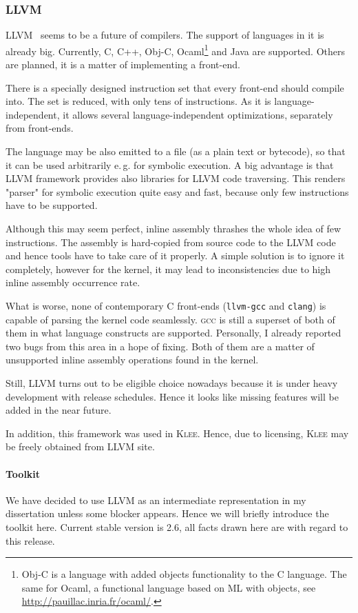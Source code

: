 \documentclass[11pt,a4paper]{article}
\begin{document}
\subsubsection{LLVM}
\label{llvm}
LLVM~\cite{llvm} seems to be a future of compilers. The support of languages
in it is already big. Currently, C, C++, Obj-C, Ocaml\footnote{Obj-C is a
language with added objects functionality to the C language. The same for
Ocaml, a functional language based on ML with objects, see
\url{http://pauillac.inria.fr/ocaml/}.} and Java are supported.  Others are
planned, it is a matter of implementing a front-end.

There is a specially designed instruction set that every front-end should
compile into. The set is reduced, with only tens of instructions. As it is
language-independent, it allows several language-independent optimizations,
separately from front-ends.

The language may be also emitted to a file (as a plain text or bytecode), so
that it can be used arbitrarily e.\,g. for symbolic execution. A big advantage
is that LLVM framework provides also libraries for LLVM code traversing. This
renders "parser" for symbolic execution quite easy and fast, because only few
instructions have to be supported.

Although this may seem perfect, inline assembly thrashes the whole idea of few
instructions. The assembly is hard-copied from source code to the LLVM code
and hence tools have to take care of it properly. A simple solution is to
ignore it completely, however for the kernel, it may lead to inconsistencies
due to high inline assembly occurrence rate.

What is worse, none of contemporary C front-ends (\texttt{llvm-gcc} and
\texttt{clang}) is capable of parsing the kernel code seamlessly. \textsc{gcc}
is still a superset of both of them in what language constructs are supported.
Personally, I already reported two bugs from this area in a hope of fixing.
Both of them are a matter of unsupported inline assembly operations found in
the kernel.

Still, LLVM turns out to be eligible choice nowadays because it is under heavy
development with release schedules. Hence it looks like missing features will
be added in the near future.

In addition, this framework was used in \textsc{Klee}. Hence, due to
licensing, \textsc{Klee} may be freely obtained from LLVM site.

\paragraph{Toolkit} We have decided to use LLVM as an intermediate
representation in my dissertation unless some blocker appears. Hence we will
briefly introduce the toolkit here. Current stable version is 2.6, all facts
drawn here are with regard to this release.
\end{document}
